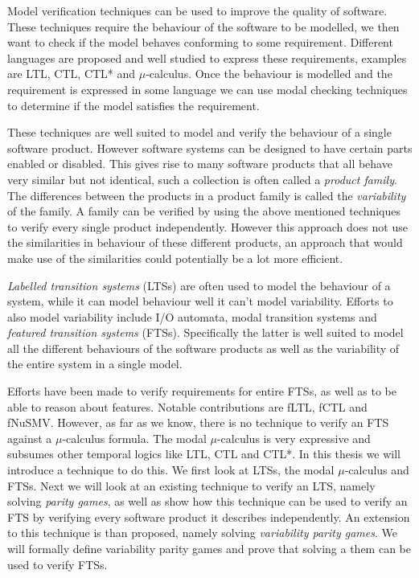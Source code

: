 Model verification techniques can be used to improve the quality of software. These techniques require the behaviour of the software to be modelled, we then want to check if the model behaves conforming to some requirement. Different languages are proposed and well studied to express these requirements, examples are LTL, CTL, CTL* and $\mu$-calculus. Once the behaviour is modelled and the requirement is expressed in some language we can use modal checking techniques to determine if the model satisfies the requirement.

These techniques are well suited to model and verify the behaviour of a single software product. However software systems can be designed to have certain parts enabled or disabled. This gives rise to many software products that all behave very similar but not identical, such a collection is often called a \textit{product family}. The differences between the products in a product family is called the \textit{variability} of the family. A family can be verified by using the above mentioned techniques to verify every single product independently. However this approach does not use the similarities in behaviour of these different products, an approach that would make use of the similarities could potentially be a lot more efficient.

\textit{Labelled transition systems} (LTSs) are often used to model the behaviour of a system, while it can model behaviour well it can't model variability. Efforts to also model variability include I/O automata, modal transition systems and \textit{featured transition systems} (FTSs). Specifically the latter is well suited to model all the different behaviours of the software products as well as the variability of the entire system in a single model.

Efforts have been made to verify requirements for entire FTSs, as well as to be able to reason about features. Notable contributions are fLTL, fCTL and fNuSMV. However, as far as we know, there is no technique to verify an FTS against a $\mu$-calculus formula. The modal $\mu$-calculus is very expressive and subsumes other temporal logics like LTL, CTL and CTL*. In this thesis we will introduce a technique to do this. We first look at LTSs, the modal $\mu$-calculus and FTSs. Next we will look at an existing technique to verify an LTS, namely solving \textit{parity games}, as well as show how this technique can be used to verify an FTS by verifying every software product it describes independently. An extension to this technique is than proposed, namely solving \textit{variability parity games}. We will formally define variability parity games and prove that solving a them can be used to verify FTSs.